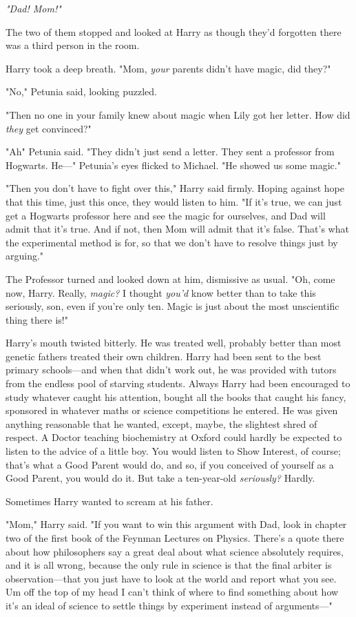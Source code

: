 \emph{"Dad! Mom!"}

The two of them stopped and looked at Harry as though they'd forgotten there
was a third person in the room.

Harry took a deep breath. "Mom, \emph{your} parents didn't have magic, did
they?"

"No," Petunia said, looking puzzled.

"Then no one in your family knew about magic when Lily got her letter. How did
\emph{they} get convinced?"

"Ah{\el}" Petunia said. "They didn't just send a letter. They sent a
professor from Hogwarts. He\mbox{---}" Petunia's eyes flicked to Michael. "He showed
us some magic."

"Then you don't have to fight over this," Harry said firmly. Hoping against
hope that this time, just this once, they would listen to him. "If it's true,
we can just get a Hogwarts professor here and see the magic for ourselves, and
Dad will admit that it's true. And if not, then Mom will admit that it's false.
That's what the experimental method is for, so that we don't have to resolve
things just by arguing."

The Professor turned and looked down at him, dismissive as usual. "Oh, come
now, Harry. Really, \emph{magic?} I thought \emph{you'd} know better than to
take this seriously, son, even if you're only ten. Magic is just about the most
unscientific thing there is!"

Harry's mouth twisted bitterly. He was treated well, probably better than most
genetic fathers treated their own children. Harry had been sent to the best
primary schools---and when that didn't work out, he was provided with tutors
from the endless pool of starving students. Always Harry had been encouraged to
study whatever caught his attention, bought all the books that caught his
fancy, sponsored in whatever maths or science competitions he entered. He was
given anything reasonable that he wanted, except, maybe, the slightest shred of
respect. A Doctor teaching biochemistry at Oxford could hardly be expected to
listen to the advice of a little boy. You would listen to Show Interest, of
course; that's what a Good Parent would do, and so, if you conceived of
yourself as a Good Parent, you would do it. But take a ten-year-old
\emph{seriously?} Hardly.

Sometimes Harry wanted to scream at his father.

"Mom," Harry said. "If you want to win this argument with Dad, look in chapter
two of the first book of the Feynman Lectures on Physics. There's a quote there
about how philosophers say a great deal about what science absolutely requires,
and it is all wrong, because the only rule in science is that the final arbiter
is observation---that you just have to look at the world and report what you
see. Um{\el} off the top of my head I can't think of where to find something
about how it's an ideal of science to settle things by experiment instead of
arguments\mbox{---}"


